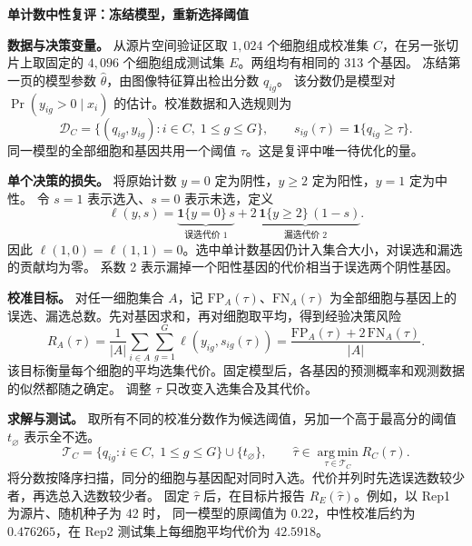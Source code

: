 \documentclass[UTF8,a4paper,11pt,fontset=fandol]{ctexart}
\newcommand{\ind}{\mathbf{1}}
\begin{document}
\newpage
\begin{center}
  {\Large\bfseries 单计数中性复评：冻结模型，重新选择阈值}
\end{center}

\textbf{数据与决策变量。}
从源片空间验证区取 \(1{,}024\) 个细胞组成校准集 \(C\)，在另一张切片上取固定的
\(4{,}096\) 个细胞组成测试集 \(E\)。两组均有相同的 313 个基因。
冻结第一页的模型参数 \(\hat\theta\)，由图像特征算出检出分数 \(q_{ig}\)。
该分数仍是模型对 \(\Pr(y_{ig}>0\mid x_i)\) 的估计。校准数据和入选规则为
\[
 \mathcal D_C=\{(q_{ig},y_{ig}):i\in C,\;1\le g\le G\},\qquad
 s_{ig}(\tau)=\ind\{q_{ig}\ge\tau\}.
\]
同一模型的全部细胞和基因共用一个阈值 \(\tau\)。这是复评中唯一待优化的量。

\textbf{单个决策的损失。}
将原始计数 \(y=0\) 定为阴性，\(y\ge2\) 定为阳性，\(y=1\) 定为中性。
令 \(s=1\) 表示选入、\(s=0\) 表示未选，定义
\[
 \ell(y,s)=\underbrace{\ind\{y=0\}\,s}_{\text{误选代价 }1}
          +\underbrace{2\,\ind\{y\ge2\}\,(1-s)}_{\text{漏选代价 }2}.
\]
因此 \(\ell(1,0)=\ell(1,1)=0\)。选中单计数基因仍计入集合大小，对误选和漏选的贡献均为零。
系数 2 表示漏掉一个阳性基因的代价相当于误选两个阴性基因。

\textbf{校准目标。}
对任一细胞集合 \(A\)，记 \(\mathrm{FP}_A(\tau)\)、\(\mathrm{FN}_A(\tau)\)
为全部细胞与基因上的误选、漏选总数。先对基因求和，再对细胞取平均，得到经验决策风险
\[
 R_A(\tau)=\frac{1}{|A|}\sum_{i\in A}\sum_{g=1}^{G}\ell\!\left(y_{ig},s_{ig}(\tau)\right)
          =\frac{\mathrm{FP}_A(\tau)+2\,\mathrm{FN}_A(\tau)}{|A|}.
\]
该目标衡量每个细胞的平均选集代价。固定模型后，各基因的预测概率和观测数据的似然都随之确定。
调整 \(\tau\) 只改变入选集合及其代价。

\textbf{求解与测试。}
取所有不同的校准分数作为候选阈值，另加一个高于最高分的阈值 \(t_{\varnothing}\) 表示全不选。
\[
 \mathcal T_C=\{q_{ig}:i\in C,\;1\le g\le G\}\cup\{t_{\varnothing}\},\qquad
 \hat\tau\in\operatorname*{arg\,min}_{\tau\in\mathcal T_C} R_C(\tau).
\]
将分数按降序扫描，同分的细胞与基因配对同时入选。代价并列时先选误选数较少者，再选总入选数较少者。
固定 \(\hat\tau\) 后，在目标片报告 \(R_E(\hat\tau)\)。例如，以 Rep1 为源片、随机种子为 42 时，
同一模型的原阈值为 \(0.22\)，中性校准后约为 \(0.476265\)，在 Rep2 测试集上每细胞平均代价为 \(42.5918\)。
\end{document}
